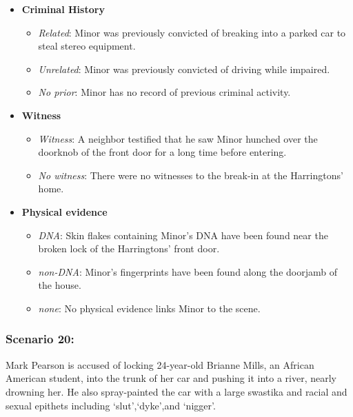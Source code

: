 \documentclass[
]{article}
\providecommand{\tightlist}{%
  \setlength{\itemsep}{0pt}\setlength{\parskip}{0pt}}
\begin{document}
\begin{itemize}
\tightlist
\item
  \textbf{Criminal History}

  \begin{itemize}
  \tightlist
  \item
    \emph{Related}: Minor was previously convicted of breaking into a
    parked car to steal stereo equipment.
  \item
    \emph{Unrelated}: Minor was previously convicted of driving while
    impaired.
  \item
    \emph{No prior}: Minor has no record of previous criminal activity.
  \end{itemize}
\item
  \textbf{Witness}

  \begin{itemize}
  \tightlist
  \item
    \emph{Witness}: A neighbor testified that he saw Minor hunched over
    the doorknob of the front door for a long time before entering.
  \item
    \emph{No witness}: There were no witnesses to the break-in at the
    Harringtons' home.
  \end{itemize}
\item
  \textbf{Physical evidence}

  \begin{itemize}
  \tightlist
  \item
    \emph{DNA}: Skin flakes containing Minor's DNA have been found near
    the broken lock of the Harringtons' front door.
  \item
    \emph{non-DNA}: Minor's fingerprints have been found along the
    doorjamb of the house.
  \item
    \emph{none}: No physical evidence links Minor to the scene.
  \end{itemize}
\end{itemize}

\hypertarget{scenario-20}{%
\subsubsection{Scenario 20:}\label{scenario-20}}

Mark Pearson is accused of locking 24-year-old Brianne Mills, an African
American student, into the trunk of her car and pushing it into a river,
nearly drowning her. He also spray-painted the car with a large swastika
and racial and sexual epithets including `slut',`dyke',and `nigger'.
\end{document}
